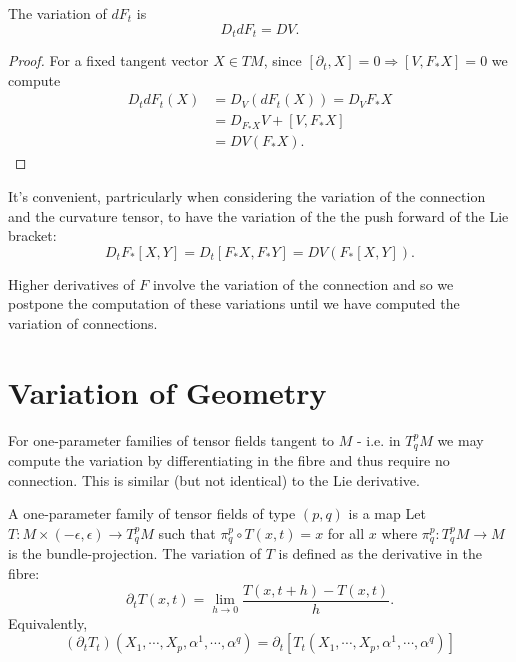 \begin{prop}
The variation of \(dF_t\) is
\[
D_t dF_t = DV.
\]
\end{prop}

\begin{proof}
For a fixed tangent vector \(X \in TM\), since \([\partial_t, X] = 0 \Rightarrow [V, F_{\ast} X] = 0\) we compute
\[
\begin{split}
D_t dF_t (X) &= D_V (dF_t (X)) = D_V F_{\ast} X \\
&= D_{F_{\ast} X} V + [V, F_{\ast} X] \\
&= DV (F_{\ast} X).
\end{split}
\]
\end{proof}

\begin{rem}
It's convenient, partricularly when considering the variation of the connection and the curvature tensor, to have the variation of the the push forward of the Lie bracket:
\[
D_t F_{\ast} [X, Y] = D_t [F_{\ast} X, F_{\ast} Y] = DV(F_{\ast} [X, Y]).
\]
\end{rem}

Higher derivatives of \(F\) involve the variation of the connection and so we postpone the computation of these variations until we have computed the variation of connections.

\section{Variation of Geometry}

For one-parameter families of tensor fields tangent to \(M\) - i.e. in \(T^p_q M\) we may compute the variation by differentiating in the fibre and thus require no connection. This is similar (but not identical) to the Lie derivative.

\begin{defn}
A one-parameter family of tensor fields of type \((p, q)\) is a map
Let \(T : M \times (-\epsilon, \epsilon) \to T^p_q M\) such that \(\pi^p_q \circ T(x, t) = x\) for all \(x\) where \(\pi^p_q : T^p_q M \to M\) is the bundle-projection. The variation of \(T\) is defined as the derivative in the fibre:
\[
\partial_t T (x, t) = \lim_{h\to 0} \frac{T(x, t + h) - T(x, t)}{h}.
\]
Equivalently,
\[
(\partial_t T_t) (X_1, \cdots, X_p, \alpha^1, \cdots, \alpha^q) = \partial_t \left[T_t (X_1, \cdots, X_p, \alpha^1, \cdots, \alpha^q)\right]
\]
\end{defn}

